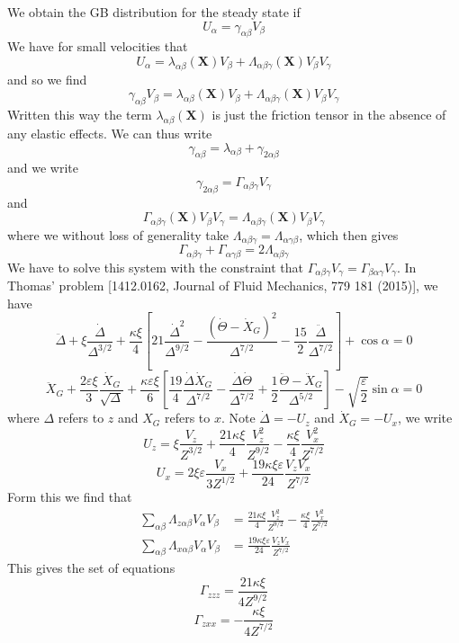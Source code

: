 \documentclass[books,12pt]{elegantpaper}
\newcommand{\beq}{\begin{equation}}
\newcommand{\eeq}{\end{equation}}
\newcommand{\bgn}{\begin{align}}
\newcommand{\tlag}[1]{\tag{#1} \label{#1}}
\newcommand{\veps}{\varepsilon}
\begin{document}
We obtain the GB distribution for the steady state if 
\beq U_\alpha = \gamma_{\alpha\beta} V_\beta \tlag{David.5} \eeq
We have for small velocities that
\beq U_\alpha = \lambda_{\alpha\beta} (\mathbf{X}) V_\beta + \Lambda_{\alpha\beta\gamma} (\mathbf{X}) V_\beta V_\gamma \tlag{David.6} \eeq
and so we find
\beq \gamma_{\alpha\beta} V_\beta = \lambda_{\alpha\beta}(\mathbf{X}) V_\beta + \Lambda_{\alpha\beta\gamma} (\mathbf{X}) V_\beta V_\gamma \tlag{David.7} \eeq
Written this way the term $\lambda_{\alpha\beta}(\mathbf{X})$ is just the friction tensor in the absence of any elastic effects. We can thus write
\beq \gamma_{\alpha\beta} = \lambda_{\alpha\beta} + \gamma_{2\alpha\beta} \tlag{David.8} \eeq
and we write
\beq \gamma_{2\alpha\beta} = \Gamma_{\alpha\beta\gamma} V_\gamma \tlag{David.9} \eeq
and
\beq \Gamma_{\alpha\beta\gamma} (\mathbf{X}) V_\beta V_\gamma = \Lambda_{\alpha\beta\gamma} (\mathbf{X}) V_\beta V_\gamma \tlag{David.10} \eeq
where we without loss of generality take $\Lambda_{\alpha\beta\gamma} = \Lambda_{\alpha\gamma\beta}$, which then gives
\beq \Gamma_{\alpha\beta\gamma} + \Gamma_{\alpha\gamma\beta} = 2 \Lambda_{\alpha\beta\gamma} \tlag{David.11} \eeq
We have to solve this system with the constraint that $\Gamma_{\alpha\beta\gamma} V_\gamma = \Gamma_{\beta\alpha\gamma} V_\gamma$. In Thomas' problem [1412.0162, Journal of Fluid Mechanics, 779 181 (2015)], we have
$$ \ddot{\Delta} + \xi \frac{\dot{\Delta}}{\Delta^{3/2}} + \frac{\kappa\xi}{4} \left[ 21 \frac{\dot{\Delta}^2}{\Delta^{9/2}} - \frac{(\dot\Theta - \dot{X}_G)^2}{\Delta^{7/2}} - \frac{15}{2} \frac{\ddot\Delta}{\Delta^{7/2}} \right] + \cos\alpha = 0 $$
$$ \ddot{X}_G + \frac{2\varepsilon \xi}{3} \frac{\dot{X}_G}{\sqrt\Delta} + \frac{\kappa \varepsilon \xi}{6} \left[ \frac{19}{4} \frac{\dot\Delta \dot{X}_G}{\Delta^{7/2}} - \frac{\dot\Delta \dot\Theta}{\Delta^{7/2}} + \frac{1}{2} \frac{\ddot\Theta - \ddot{X}_G}{\Delta^{5/2}} \right] - \sqrt{\frac{\varepsilon}{2}} \sin\alpha = 0 $$
where $\Delta$ refers to $z$ and $X_G$ refers to $x$. Note $\dot\Delta=-U_z$ and $\dot{X}_G=-U_x$, we write
\beq U_z = \xi \frac{V_z}{Z^{3/2}} + \frac{21 \kappa \xi}{4} \frac{V_z^2}{Z^{9/2}} - \frac{\kappa \xi}{4} \frac{V_x^2}{Z^{7/2}}  \tlag{David.12} \eeq
\beq U_x = 2 \xi\veps \frac{V_x}{3Z^{1/2}} + \frac{19 \kappa \xi \veps}{24} \frac{V_z V_x}{Z^{7/2}} \tlag{David.13} \eeq
Form this we find that
\beq \bgn
\sum_{\alpha\beta} \Lambda_{z\alpha\beta} V_\alpha V_\beta &= \frac{21 \kappa \xi}{4} \frac{V_z^2}{Z^{9/2}} - \frac{\kappa \xi}{4} \frac{V_x^2}{Z^{7/2}} \\
\sum_{\alpha\beta} \Lambda_{x\alpha\beta} V_\alpha V_\beta &= \frac{19 \kappa \xi \veps}{24} \frac{V_z V_x}{Z^{7/2}}
\end{align} \tlag{David.14} \eeq
This gives the set of equations
\beq \Gamma_{zzz} = \frac{21 \kappa \xi}{4 Z^{9/2}} \tlag{David.15} \eeq
\beq \Gamma_{zxx} = - \frac{\kappa \xi}{4Z^{7/2}} \tlag{David.16} \eeq
\end{document}
